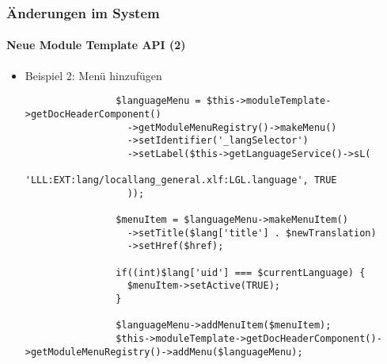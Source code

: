 
\begin{frame}[fragile]
	\frametitle{Änderungen im System}
	\framesubtitle{Neue Module Template API (2)}

	\lstset{basicstyle=\tiny\ttfamily}

	\begin{itemize}
		\item Beispiel 2: Menü hinzufügen

			\begin{lstlisting}
				$languageMenu = $this->moduleTemplate->getDocHeaderComponent()
				  ->getModuleMenuRegistry()->makeMenu()
				  ->setIdentifier('_langSelector')
				  ->setLabel($this->getLanguageService()->sL(
				    'LLL:EXT:lang/locallang_general.xlf:LGL.language', TRUE
				  ));

				$menuItem = $languageMenu->makeMenuItem()
				  ->setTitle($lang['title'] . $newTranslation)
				  ->setHref($href);

				if((int)$lang['uid'] === $currentLanguage) {
				  $menuItem->setActive(TRUE);
				}

				$languageMenu->addMenuItem($menuItem);
				$this->moduleTemplate->getDocHeaderComponent()->getModuleMenuRegistry()->addMenu($languageMenu);
			\end{lstlisting}
	\end{itemize}

\end{frame}



